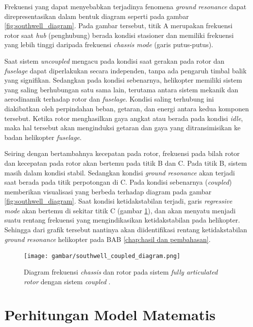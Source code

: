 Frekuensi yang dapat menyebabkan terjadinya fenomena \textit{ground resonance} dapat direpresentasikan dalam bentuk diagram seperti pada gambar \ref{fig:southwell_diagram}. Pada gambar tersebut, titik A merupakan frekuensi rotor saat \textit{hub} (penghubung) berada kondisi stasioner dan memiliki frekuensi yang lebih tinggi daripada frekuensi \textit{chassis mode} (garis putus-putus). 

Saat sistem \textit{uncoupled} mengacu pada kondisi saat gerakan pada rotor dan \textit{fuselage} dapat diperlakukan secara independen, tanpa ada pengaruh timbal balik yang signifikan. Sedangkan pada kondisi sebenarnya, helikopter memiliki sistem yang saling berhubungan satu sama lain, terutama antara sistem mekanik dan aerodinamik terhadap rotor dan \textit{fuselage}. Kondisi saling terhubung ini diakibatkan oleh perpindahan beban, getaran, dan energi antara kedua komponen tersebut. Ketika rotor menghasilkan gaya angkat atau berada pada kondisi \textit{idle}, maka hal tersebut akan menginduksi getaran dan gaya yang ditransimisikan ke badan helikopter \textit{fuselage}. 

Seiring dengan bertambahnya kecepatan pada rotor, frekuensi pada bilah rotor dan kecepatan pada rotor akan bertemu pada titik B dan C. Pada titik B, sistem masih dalam kondisi stabil. Sedangkan kondisi \textit{ground resonance} akan terjadi saat berada pada titik perpotongan di C. Pada kondisi sebenarnya (\textit{coupled}) memberikan visualisasi yang berbeda terhadap diagram pada gambar \ref{fig:southwell_diagram}. Saat kondisi ketidakstabilan terjadi, garis \textit{regressive mode} akan bertemu di sekitar titik C (gambar \ref{fig:southwell_coupled_diagram}), dan akan menyatu menjadi suatu rentang frekuensi yang mengindikasikan ketidakstabilan pada helikopter. Sehingga dari grafik tersebut nantinya akan diidentifikasi rentang ketidakstabilan \textit{ground resonance} helikopter pada BAB \ref{chap:hasil dan pembahasan}.

\begin{figure}[H]
	\centering
	\texttt{[image: gambar/southwell\_coupled\_diagram.png]}
	\caption{Diagram frekuensi \textit{chassis} dan rotor pada sistem \textit{fully articulated rotor} dengan sistem \textit{coupled} \cite{bramwell2001bramwell}.}
	\label{fig:southwell_coupled_diagram}
\end{figure}


\section{Perhitungan Model Matematis}
\label{Matematis}

